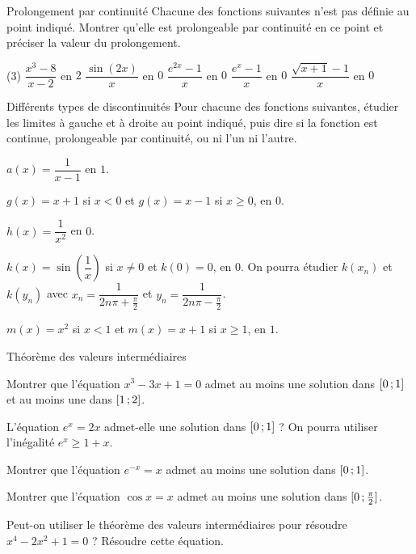 \begin{exercice}[2]{Prolongement par continuité}
Chacune des fonctions suivantes n'est pas définie au point indiqué. Montrer qu'elle est prolongeable par continuité
en ce point et préciser la valeur du prolongement.
\begin{tasks}(3)
  \task $\dfrac{x^{3}-8}{x-2}$ en $2$
  \task $\dfrac{\sin(2x)}{x}$ en $0$
  \task $\dfrac{e^{2x}-1}{x}$ en $0$
  \task $\dfrac{e^{x}-1}{x}$ en $0$
  \task $\dfrac{\sqrt{x+1}-1}{x}$ en $0$
\end{tasks}
\end{exercice}

\begin{exercice}[2]{Différents types de discontinuités}
Pour chacune des fonctions suivantes, étudier les limites à gauche et à droite au point indiqué, puis dire si la fonction
est continue, prolongeable par continuité, ou ni l'un ni l'autre.
\begin{questions}
  \item $a(x)=\dfrac{1}{x-1}$ en $1$.
  \item $g(x)=x+1$ si $x<0$ et $g(x)=x-1$ si $x\geq0$, en $0$.
  \item $h(x)=\dfrac{1}{x^{2}}$ en $0$.
  \item $k(x)=\sin\left(\dfrac1x\right)$ si $x\neq0$ et $k(0)=0$, en $0$. On pourra étudier $k(x_n)$ et $k(y_n)$ avec
    $x_n=\dfrac{1}{2n\pi+\frac{\pi}{2}}$ et $y_n=\dfrac{1}{2n\pi-\frac{\pi}{2}}$.
  \item $m(x)=x^{2}$ si $x<1$ et $m(x)=x+1$ si $x\geq1$, en $1$.
\end{questions}
\end{exercice}

\begin{exercice}[2]{Théorème des valeurs intermédiaires}
\begin{questions}
  \item Montrer que l'équation $x^{3}-3x+1=0$ admet au moins une solution dans $\mathopen{[}0\,{;}\,1\mathclose{]}$ et au moins une dans $\mathopen{[}1\,{;}\,2\mathclose{]}$.
  \item L'équation $e^{x}=2x$ admet-elle une solution dans $\mathopen{[}0\,{;}\,1\mathclose{]}$ ? On pourra utiliser l'inégalité $e^{x}\geq1+x$.
  \item Montrer que l'équation $e^{-x}=x$ admet au moins une solution dans $\mathopen{[}0\,{;}\,1\mathclose{]}$.
  \item Montrer que l'équation $\cos x=x$ admet au moins une solution dans $\mathopen{[}0\,{;}\,\frac{\pi}{2}\mathclose{]}$.
  \item Peut-on utiliser le théorème des valeurs intermédiaires pour résoudre $x^{4}-2x^{2}+1=0$ ? Résoudre cette équation.
\end{questions}
\end{exercice}

